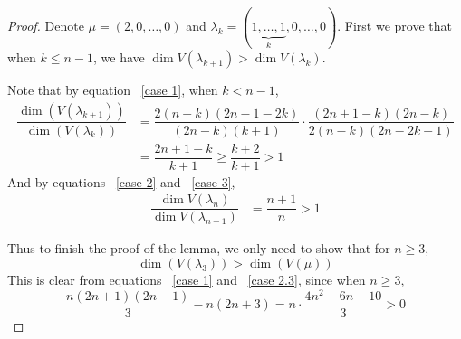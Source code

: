 \documentclass[10pt,a4paper]{amsart}
\begin{document}
\begin{proof}
	Denote $\mu=(2,0,\ldots,0)$ and $\lambda_k=(\underbrace{1,\ldots,1}_k,0,\ldots,0)$. First we prove that when $k\leqslant n-1$, we have $\dim V(\lambda_{k+1})>\dim V(\lambda_k)$. 

Note that by equation ~\eqref{case 1}, when $k<n-1$, 
    \begin{equation}\label{quotient of V(mu)}
    \begin{aligned}
        \dfrac{\dim(V(\lambda_{k+1}))}{\dim(V(\lambda_k))}&=\dfrac{2(n-k)(2n-1-2k)}{(2n-k)(k+1)}\cdot \dfrac{(2n+1-k)(2n-k)}{2(n-k)(2n-2k-1)}\\
        &=\dfrac{2n+1-k}{k+1}\geqslant \dfrac{k+2}{k+1}>1
    \end{aligned}
    \end{equation}
    And by equations ~\eqref{case 2} and ~\eqref{case 3},
    \[\begin{aligned}
    \dfrac{\dim V(\lambda_n)}{\dim V(\lambda_{n-1})}&=\dfrac{n+1}{n}>1
    \end{aligned}
    \]


Thus to finish the proof of the lemma, we only need to show that for $n\geqslant 3$,
\begin{equation}
    \dim(V(\lambda_3))> \dim(V(\mu))
\end{equation}
This is clear from equations ~\eqref{case 1} and ~\eqref{case 2.3}, since when $n\geq 3$,
\[
\dfrac{n(2n+1)(2n-1)}{3}-n(2n+3)=n\cdot \dfrac{4n^2-6n-10}{3}>0
\]

\end{proof}
\end{document}
